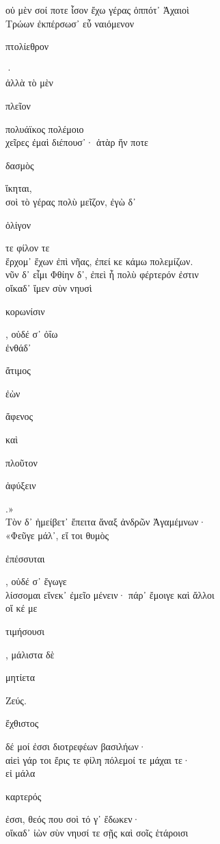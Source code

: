 \documentclass{ransom}
\begin{document}
\renewcommand{\rightheaderwhat}{\rightheaderwhatglosses}%
\begin{foreignpage}
\begin{graytext}
οὐ μὲν σοί ποτε ἶσον ἔχω γέρας ὁππότ᾽ Ἀχαιοὶ\\
Τρώων ἐκπέρσωσ᾽ εὖ ναιόμενον \begin{whitetext}πτολίεθρον\end{whitetext}·\\
ἀλλὰ τὸ μὲν \begin{whitetext}πλεῖον\end{whitetext} πολυάϊκος πολέμοιο\hfill{}\\
χεῖρες ἐμαὶ διέπουσ᾽· ἀτὰρ ἤν ποτε \begin{whitetext}δασμὸς\end{whitetext} ἵκηται,\\
σοὶ τὸ γέρας πολὺ μεῖζον, ἐγὼ δ᾽ \begin{whitetext}ὀλίγον\end{whitetext} τε φίλον τε\\
ἔρχομ᾽ ἔχων ἐπὶ νῆας, ἐπεί κε κάμω πολεμίζων.\\
νῦν δ᾽ εἶμι Φθίην δ᾽, ἐπεὶ ἦ πολὺ φέρτερόν ἐστιν\\
οἴκαδ᾽ ἴμεν σὺν νηυσὶ \begin{whitetext}κορωνίσιν\end{whitetext}, οὐδέ σ᾽ ὀΐω\hfill{}\\
ἐνθάδ᾽ \begin{whitetext}ἄτιμος\end{whitetext} ἐὼν \begin{whitetext}ἄφενος\end{whitetext} καὶ \begin{whitetext}πλοῦτον\end{whitetext} \begin{whitetext}ἀφύξειν\end{whitetext}.»\\
Τὸν δ᾽ ἠμείβετ᾽ ἔπειτα ἄναξ ἀνδρῶν Ἀγαμέμνων·\\
«Φεῦγε μάλ᾽, εἴ τοι θυμὸς \begin{whitetext}ἐπέσσυται\end{whitetext}, οὐδέ σ᾽ ἔγωγε\\
λίσσομαι εἵνεκ᾽ ἐμεῖο μένειν· πάρ᾽ ἔμοιγε καὶ ἄλλοι\\
οἵ κέ με \begin{whitetext}τιμήσουσι\end{whitetext}, μάλιστα δὲ \begin{whitetext}μητίετα\end{whitetext} Ζεύς.\hfill{}\\
\begin{whitetext}ἔχθιστος\end{whitetext} δέ μοί ἐσσι διοτρεφέων βασιλήων·\\
αἰεὶ γάρ τοι ἔρις τε φίλη πόλεμοί τε μάχαι τε·\\
εἰ μάλα \begin{whitetext}καρτερός\end{whitetext} ἐσσι, θεός που σοὶ τό γ᾽ ἔδωκεν·\\
οἴκαδ᾽ ἰὼν σὺν νηυσί τε σῇς καὶ σοῖς ἑτάροισι\\


\end{graytext}
\end{foreignpage}
\end{document}
